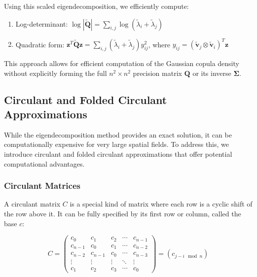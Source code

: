 \documentclass[journal=,manuscript=]{achemso}
\begin{document}
Using this scaled eigendecomposition, we efficiently compute:

\begin{enumerate}
\def\labelenumi{\arabic{enumi}.}
\item
  Log-determinant:
  \(\log|\mathbf{\widetilde Q}| = \sum_{i,j} \log(\widetilde\lambda_i + \widetilde\lambda_j)\)
\item
  Quadratic form:
  \(\mathbf{z}^T\mathbf{\widetilde Q}\mathbf{z} = \sum_{i,j} (\widetilde\lambda_i + \widetilde\lambda_j) y_{ij}^2\),
  where
  \(y_{ij} = (\mathbf{\widetilde v}_j \otimes \mathbf{\widetilde v}_i)^T\mathbf{z}\)
\end{enumerate}

This approach allows for efficient computation of the Gaussian copula
density without explicitly forming the full \(n^2 \times n^2\) precision
matrix \(\mathbf{Q}\) or its inverse \(\mathbf{\Sigma}\).

\subsection{Circulant and Folded Circulant
Approximations}\label{circulant-and-folded-circulant-approximations}

While the eigendecomposition method provides an exact solution, it can
be computationally expensive for very large spatial fields. To address
this, we introduce circulant and folded circulant approximations that
offer potential computational advantages.

\subsubsection{Circulant Matrices}\label{circulant-matrices}

A circulant matrix \(C\) is a special kind of matrix where each row is a
cyclic shift of the row above it. It can be fully specified by its first
row or column, called the base \(c\):

\[
C = \begin{pmatrix}
c_0 & c_1 & c_2 & \cdots & c_{n-1} \\
c_{n-1} & c_0 & c_1 & \cdots & c_{n-2} \\
c_{n-2} & c_{n-1} & c_0 & \cdots & c_{n-3} \\
\vdots & \vdots & \vdots & \ddots & \vdots \\
c_1 & c_2 & c_3 & \cdots & c_0
\end{pmatrix} = (c_{j-i \mod n})
\]
\end{document}
